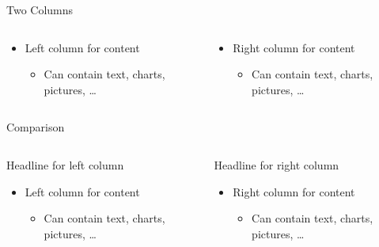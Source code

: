 \documentclass[10pt]{beamer} %
\begin{document}
\begin{frame}[t]{Two Columns} %
\begin{columns}
  \begin{column}{0.5\textwidth}
    \begin{itemize}
	  \item Left column for content
	  \begin{itemize}
	  	\item Can contain text, charts, pictures, … 
		\end{itemize}
	\end{itemize}
  \end{column}
  \begin{column}{0.5\textwidth}  %
    \begin{itemize}
	  \item Right column for content
	  \begin{itemize}
	  	\item Can contain text, charts, pictures, … 
		\end{itemize}
	\end{itemize}
  \end{column}
\end{columns}
\end{frame}


\begin{frame}[t]{Comparison} %
\begin{columns}
  \begin{column}{0.5\textwidth}
  	{\large \textcolor{hellblauMUW}{Headline for left column}}
    \begin{itemize}
	  \item Left column for content
	  \begin{itemize}
	  	\item Can contain text, charts, pictures, … 
		\end{itemize}
	\end{itemize}
  \end{column}
  \begin{column}{0.5\textwidth}  %
  {\large \textcolor{hellblauMUW}{Headline for right column}}
    \begin{itemize}
	  \item Right column for content
	  \begin{itemize}
	  	\item Can contain text, charts, pictures, … 
		\end{itemize}
	\end{itemize}
  \end{column}
\end{columns}
\end{frame}
\end{document}

